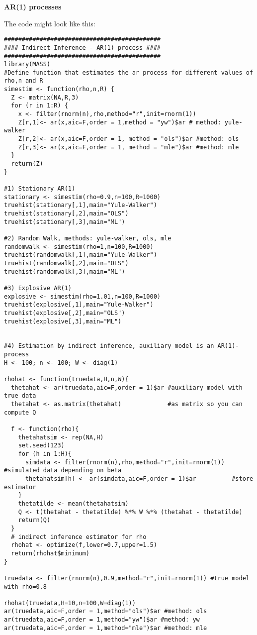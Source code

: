 \begin{Solution}{15.1}
\textbf{AR(1) processes}

The code might look like this:
\begin{verbatim}
############################################
#### Indirect Inference - AR(1) process ####
############################################
library(MASS)
#Define function that estimates the ar process for different values of rho,n and R
simestim <- function(rho,n,R) {
  Z <- matrix(NA,R,3)
  for (r in 1:R) {
    x <- filter(rnorm(n),rho,method="r",init=rnorm(1))
    Z[r,1]<- ar(x,aic=F,order = 1,method = "yw")$ar # method: yule-walker
    Z[r,2]<- ar(x,aic=F,order = 1, method = "ols")$ar #method: ols
    Z[r,3]<- ar(x,aic=F,order = 1, method = "mle")$ar #method: mle
  }
  return(Z)
}

#1) Stationary AR(1)
stationary <- simestim(rho=0.9,n=100,R=1000)
truehist(stationary[,1],main="Yule-Walker")
truehist(stationary[,2],main="OLS")
truehist(stationary[,3],main="ML")

#2) Random Walk, methods: yule-walker, ols, mle
randomwalk <- simestim(rho=1,n=100,R=1000)
truehist(randomwalk[,1],main="Yule-Walker")
truehist(randomwalk[,2],main="OLS")
truehist(randomwalk[,3],main="ML")

#3) Explosive AR(1)
explosive <- simestim(rho=1.01,n=100,R=1000)
truehist(explosive[,1],main="Yule-Walker")
truehist(explosive[,2],main="OLS")
truehist(explosive[,3],main="ML")


#4) Estimation by indirect inference, auxiliary model is an AR(1)-process
H <- 100; n <- 100; W <- diag(1)

rhohat <- function(truedata,H,n,W){
  thetahat <- ar(truedata,aic=F,order = 1)$ar #auxiliary model with true data
  thetahat <- as.matrix(thetahat)             #as matrix so you can compute Q

  f <- function(rho){
    thetahatsim <- rep(NA,H)
    set.seed(123)
    for (h in 1:H){
      simdata <- filter(rnorm(n),rho,method="r",init=rnorm(1)) #simulated data depending on beta
      thetahatsim[h] <- ar(simdata,aic=F,order = 1)$ar          #store estimator
    }
    thetatilde <- mean(thetahatsim)
    Q <- t(thetahat - thetatilde) %*% W %*% (thetahat - thetatilde)
    return(Q)
  }
  # indirect inference estimator for rho
  rhohat <- optimize(f,lower=0.7,upper=1.5)
  return(rhohat$minimum)
}

truedata <- filter(rnorm(n),0.9,method="r",init=rnorm(1)) #true model with rho=0.8

rhohat(truedata,H=10,n=100,W=diag(1))
ar(truedata,aic=F,order = 1,method="ols")$ar #method: ols
ar(truedata,aic=F,order = 1,method="yw")$ar #method: yw
ar(truedata,aic=F,order = 1,method="mle")$ar #method: mle
\end{verbatim}
\end{Solution}
